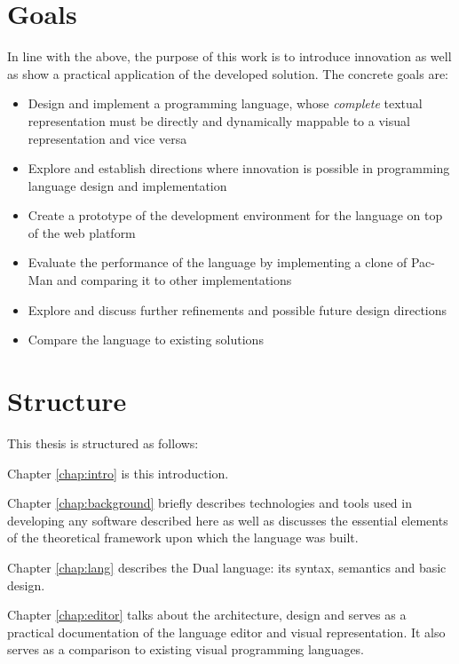 \section{Goals}
In line with the above, the purpose of this work is to introduce innovation as well as show a practical application of the developed solution. The concrete goals are:
\begin{itemize}
	\item Design and implement a programming language, whose \textit{complete} textual representation must be directly and dynamically mappable to a visual representation and vice versa
	\item Explore and establish directions where innovation is possible in programming language design and implementation
	\item Create a prototype of the development environment for the language on top of the web platform
	\item Evaluate the performance of the language by implementing a clone of Pac-Man and comparing it to other implementations
	\item Explore and discuss further refinements and possible future design directions
	\item Compare the language to existing solutions %
\end{itemize}

\section{Structure}
This thesis is structured as follows:

Chapter \ref{chap:intro} is this introduction.

Chapter \ref{chap:background} briefly describes technologies and tools used in developing any software described here as well as discusses the essential elements of the theoretical framework upon which the language was built.

Chapter \ref{chap:lang} describes the Dual language: its syntax, semantics and basic design.

Chapter \ref{chap:editor} talks about the architecture, design and serves as a practical documentation of the language editor and visual representation. It also serves as a comparison to existing visual programming languages.

